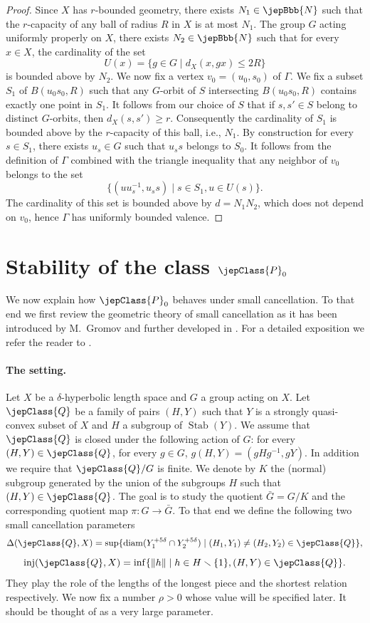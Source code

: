 \begin{proof}
Since $X$ has $r$-bounded geometry, there exists $N_1\in\jepBbb{N}$ such that the $r$-capacity of any ball of radius $R$ in $X$ is at most $N_1$. The group $G$ acting uniformly properly
on $X$, there exists $N_2\in\jepBbb{N}$ such that for every $x\in X$, the cardinality of the set
\[
U(x)=\{g\in G\mid d_X(x,gx)\leqslant2R\}
\]
is bounded above by $N_2$. We now fix a vertex $v_0=(u_0,s_0)$ of $\Gamma$. We fix a subset $S_1$ of $B(u_0s_0,R)$ such that any $G$-orbit of $S$ intersecting $B(u_0s_0,R)$ contains exactly one point in $S_1$. It follows from our choice of $S$ that if $s,s'\in S$ belong to distinct $G$-orbits, then $d_X(s,s')\geqslant r$. Consequently the cardinality of $S_1$ is bounded above by the $r$-capacity of this ball, i.e., $N_1$. By construction for every $s\in S_1$, there exists $u_s\in G$ such that $u_ss$ belongs to $S_0$. It follows from the definition of $\Gamma$ combined with the triangle inequality that any neighbor of $v_0$ belongs to the set
\[
\{(uu_s^{-1},u_ss)\mid s\in S_1,u\in U(s)\}.
\]
The cardinality of this set is bounded above by $d=N_1N_2$, which does not depend on $v_0$, hence $\Gamma$ has uniformly bounded valence.
\end{proof}

\section{Stability of the class \texorpdfstring{$\jepClass{P}_0$}{P0}}
We now explain how $\jepClass{P}_0$ behaves under small cancellation. To that end we first review the geometric theory of small cancellation as it has been introduced by M.\ Gromov \cite{ref12} and further developed in \cite{ref09,ref05,ref08}. For a detailed exposition we refer the reader to \cite[\S\S4-6]{ref06}.

\paragraph*{The setting.}
Let $X$ be a $\delta$-hyperbolic length space and $G$ a group acting on $X$. Let $\jepClass{Q}$ be a family of pairs $(H,Y)$ such that $Y$ is a strongly quasi-convex subset of $X$ and $H$ a subgroup of $\operatorname{Stab}(Y)$. We assume that $\jepClass{Q}$ is closed under the following action of $G$: for every $(H,Y)\in\jepClass{Q}$, for every $g\in G$, $g(H,Y)=(gHg^{-1},gY)$. In addition we require that $\jepClass{Q}/G$ is finite. We denote by $K$ the (normal) subgroup generated by the union of the subgroups $H$ such that $(H,Y)\in\jepClass{Q}$. The goal is to study the quotient $\bar G=G/K$ and the corresponding quotient map $\pi:G\to\bar G$. To that end we define the following two small cancellation parameters
\[
\Delta(\jepClass{Q},X)=\sup\{\operatorname{diam}(Y_1^{+5\delta}\cap Y_2^{+5\delta})\mid(H_1,Y_1)\neq(H_2,Y_2)\in\jepClass{Q}\},
\]
\[
\operatorname{inj}(\jepClass{Q},X)=\inf\{\|h\|\mid h\in H\smallsetminus\{1\},(H,Y)\in\jepClass{Q}\}.
\]
They play the role of the lengths of the longest piece and the shortest relation respectively. We now fix a number $\rho>0$ whose value will be specified later. It should be thought of as a very large parameter.

